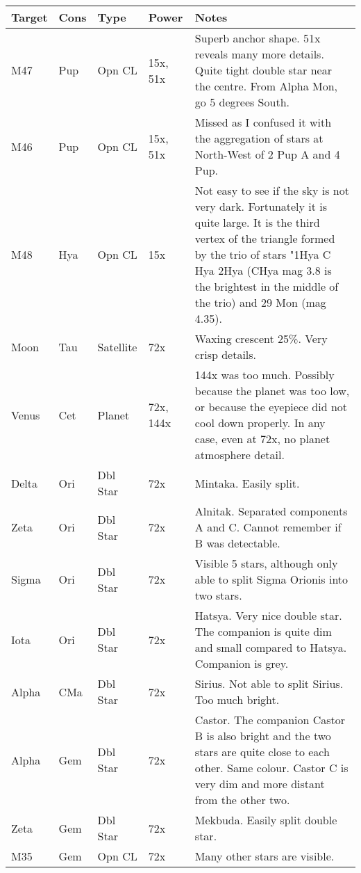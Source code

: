 \begin{longtable}{ p{0.8in}  p{0.3in}  p{0.5in}  p{0.9in}  p{5.8in} }
\hline 
{\bf Target} & {\bf Cons} & {\bf Type} & {\bf Power} & {\bf Notes} \\ 
\hline 
M47 & Pup & Opn CL & 15x, 51x & Superb anchor shape. 51x reveals many more details. Quite tight double star near the centre. From Alpha Mon, go 5 degrees South. \\ 
M46 & Pup & Opn CL & 15x, 51x & Missed as I confused it with the aggregation of stars at North-West of 2 Pup A and 4 Pup.  \\ 
M48 & Hya & Opn CL & 15x & Not easy to see if the sky is not very dark. Fortunately it is quite large. It is the third vertex of the triangle formed by the trio of stars "1Hya C Hya 2Hya (CHya mag 3.8 is the brightest in the middle of the trio) and 29 Mon (mag 4.35).  \\ 
Moon & Tau & Satellite & 72x & Waxing crescent 25\%. Very crisp details.  \\ 
Venus & Cet & Planet & 72x, 144x & 144x was too much. Possibly because the planet was too low, or because the eyepiece did not cool down properly. In any case, even at 72x, no planet atmosphere detail.  \\ 
Delta & Ori & Dbl Star & 72x & Mintaka. Easily split.  \\ 
Zeta & Ori & Dbl Star & 72x & Alnitak. Separated components A and C. Cannot remember if B was detectable. \\ 
Sigma & Ori & Dbl Star & 72x & Visible 5 stars, although only able to split Sigma Orionis into two stars. \\ 
Iota & Ori & Dbl Star & 72x & Hatsya. Very nice double star. The companion is quite dim and small compared to Hatsya. Companion is grey.  \\ 
Alpha & CMa & Dbl Star & 72x & Sirius. Not able to split Sirius. Too much bright. \\ 
Alpha & Gem & Dbl Star & 72x & Castor. The companion Castor B is also bright and the two stars are quite close to each other. Same colour. Castor C is very dim and more distant from the other two. \\ 
Zeta & Gem & Dbl Star & 72x & Mekbuda. Easily split double star. \\ 
M35 & Gem & Opn CL & 72x & Many other stars are visible.  \\ 
\hline 
\end{longtable} 
